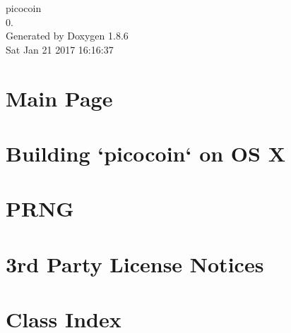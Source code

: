 \documentclass[twoside]{book}
\newcommand{\clearemptydoublepage}{%
  \newpage{\pagestyle{empty}\cleardoublepage}%
}
\begin{document}
\hypersetup{pageanchor=false}
\begin{titlepage}
\vspace*{7cm}
\begin{center}%
{\Large picocoin \\[1ex]\large 0. }\\
\vspace*{1cm}
{\large Generated by Doxygen 1.8.6}\\
\vspace*{0.5cm}
{\small Sat Jan 21 2017 16:16:37}\\
\end{center}
\end{titlepage}
\clearemptydoublepage
\tableofcontents
\clearemptydoublepage
{}
\hypersetup{pageanchor=true}

\chapter{Main Page}
\label{index}\hypertarget{index}{}
\chapter{Building `picocoin` on O\-S X}
\label{md__home_ubuntu_workspace_docs_build-osx}
\hypertarget{md__home_ubuntu_workspace_docs_build-osx}{}

\chapter{P\-R\-N\-G}
\label{md__home_ubuntu_workspace_docs_PRNG}
\hypertarget{md__home_ubuntu_workspace_docs_PRNG}{}

\chapter{3rd Party License Notices}
\label{md__home_ubuntu_workspace_LICENSE-3RD-PARTY}
\hypertarget{md__home_ubuntu_workspace_LICENSE-3RD-PARTY}{}

\chapter{Class Index}

\end{document}
